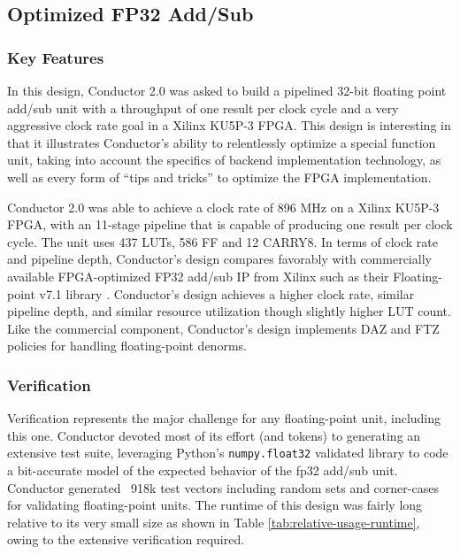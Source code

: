 \subsection{Optimized FP32 Add/Sub}

\subsubsection{Key Features}

In this design, Conductor 2.0 was asked to build a pipelined 32-bit floating point add/sub unit with a throughput of one result per clock cycle and a very aggressive clock rate goal in a Xilinx KU5P-3 FPGA. This design is interesting in that it illustrates Conductor's ability to relentlessly optimize a special function unit, taking into account the specifics of backend implementation technology, as well as every form of ``tips and tricks'' to optimize the FPGA implementation.

Conductor 2.0 was able to achieve a clock rate of 896 MHz on a Xilinx KU5P-3 FPGA, with an 11-stage pipeline that is capable of producing one result per clock cycle. The unit uses 437 LUTs, 586 FF and 12 CARRY8. In terms of clock rate and pipeline depth, Conductor's design compares favorably with commercially available FPGA-optimized FP32 add/sub IP from Xilinx such as their Floating-point v7.1 library \cite{amd_floating_point_v7_1_perf}. Conductor's design achieves a higher clock rate, similar pipeline depth, and similar resource utilization though slightly higher LUT count. Like the commercial component, Conductor's design implements DAZ and FTZ policies for handling floating-point denorms.

\subsubsection{Verification}

Verification represents the major challenge for any floating-point unit, including this one. Conductor devoted most of its effort (and tokens) to generating an extensive test suite, leveraging Python's \texttt{numpy.float32} validated library to code a bit-accurate model of the expected behavior of the fp32 add/sub unit. Conductor generated ~918k test vectors including random sets and corner-cases for validating floating-point units. The runtime of this design was fairly long relative to its very small size as shown in Table \ref{tab:relative-usage-runtime}, owing to the extensive verification required.

